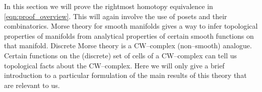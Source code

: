 \documentclass[class=article, crop=false]{standalone}
\begin{document}
In this section we will prove the rightmost homotopy equivalence in \eqref{eqn:proof_overview}. This will again involve the use of posets and their combinatorics.
Morse theory for smooth manifolds gives a way to infer topological properties of manifolds from analytical properties of certain smooth functions on that manifold. Discrete Morse theory is a CW--complex (non--smooth) analogue. Certain functions on the (discrete) set of cells of a CW--complex can tell us topological facts about the CW--complex. Here we will only give a brief introduction to a particular formulation of the main results of this theory that are relevant to us.
\end{document}
